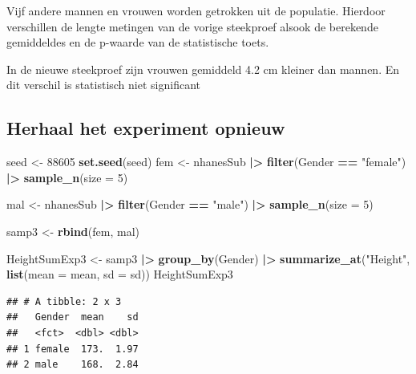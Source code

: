 \documentclass[
  12pt,dutch]{book}
\newenvironment{Shaded}{\begin{snugshade}}{\end{snugshade}}
\newcommand{\AttributeTok}[1]{\textcolor[rgb]{0.13,0.29,0.53}{#1}}
\newcommand{\DecValTok}[1]{\textcolor[rgb]{0.00,0.00,0.81}{#1}}
\newcommand{\FunctionTok}[1]{\textcolor[rgb]{0.13,0.29,0.53}{\textbf{#1}}}
\newcommand{\NormalTok}[1]{#1}
\newcommand{\OtherTok}[1]{\textcolor[rgb]{0.56,0.35,0.01}{#1}}
\newcommand{\SpecialCharTok}[1]{\textcolor[rgb]{0.81,0.36,0.00}{\textbf{#1}}}
\newcommand{\StringTok}[1]{\textcolor[rgb]{0.31,0.60,0.02}{#1}}
\theoremstyle{definition}
\theoremstyle{definition}
\theoremstyle{definition}
\theoremstyle{definition}
\theoremstyle{remark}
\begin{document}
Vijf andere mannen en vrouwen worden getrokken uit de populatie. Hierdoor verschillen de lengte metingen van de vorige steekproef alsook de berekende gemiddeldes en de p-waarde van de statistische toets.

In de nieuwe steekproef zijn vrouwen gemiddeld 4.2 cm kleiner dan mannen. En dit verschil is statistisch niet significant

\subsection{Herhaal het experiment opnieuw}\label{herhaal-het-experiment-opnieuw}

\begin{Shaded}
\begin{Highlighting}[]
\NormalTok{seed }\OtherTok{\textless{}{-}} \DecValTok{88605}
\FunctionTok{set.seed}\NormalTok{(seed)}
\NormalTok{fem }\OtherTok{\textless{}{-}}\NormalTok{ nhanesSub }\SpecialCharTok{|\textgreater{}}
    \FunctionTok{filter}\NormalTok{(Gender }\SpecialCharTok{==} \StringTok{"female"}\NormalTok{) }\SpecialCharTok{|\textgreater{}}
    \FunctionTok{sample\_n}\NormalTok{(}\AttributeTok{size =} \DecValTok{5}\NormalTok{)}

\NormalTok{mal }\OtherTok{\textless{}{-}}\NormalTok{ nhanesSub }\SpecialCharTok{|\textgreater{}}
    \FunctionTok{filter}\NormalTok{(Gender }\SpecialCharTok{==} \StringTok{"male"}\NormalTok{) }\SpecialCharTok{|\textgreater{}}
    \FunctionTok{sample\_n}\NormalTok{(}\AttributeTok{size =} \DecValTok{5}\NormalTok{)}

\NormalTok{samp3 }\OtherTok{\textless{}{-}} \FunctionTok{rbind}\NormalTok{(fem, mal)}

\NormalTok{HeightSumExp3 }\OtherTok{\textless{}{-}}\NormalTok{ samp3 }\SpecialCharTok{|\textgreater{}}
    \FunctionTok{group\_by}\NormalTok{(Gender) }\SpecialCharTok{|\textgreater{}}
    \FunctionTok{summarize\_at}\NormalTok{(}\StringTok{"Height"}\NormalTok{, }\FunctionTok{list}\NormalTok{(}\AttributeTok{mean =}\NormalTok{ mean, }\AttributeTok{sd =}\NormalTok{ sd))}
\NormalTok{HeightSumExp3}
\end{Highlighting}
\end{Shaded}

\begin{verbatim}
## # A tibble: 2 x 3
##   Gender  mean    sd
##   <fct>  <dbl> <dbl>
## 1 female  173.  1.97
## 2 male    168.  2.84
\end{verbatim}
\end{document}
